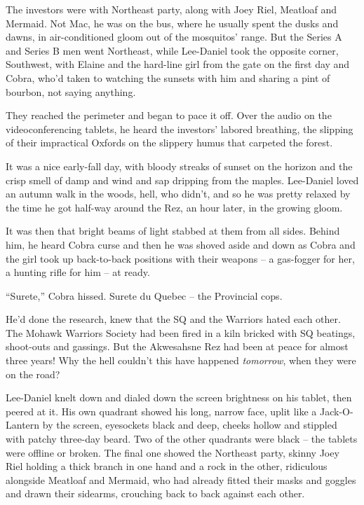 The investors were with Northeast party, along with Joey Riel, Meatloaf 
and Mermaid. Not Mac, he was on the bus, where he usually spent the 
dusks and dawns, in air-conditioned gloom out of the mosquitos' range. 
But the Series A and Series B men went Northeast, while Lee-Daniel took 
the opposite corner, Southwest, with Elaine and the hard-line girl from 
the gate on the first day and Cobra, who'd taken to watching the 
sunsets with him and sharing a pint of bourbon, not saying anything.

They reached the perimeter and began to pace it off. Over the audio on 
the videoconferencing tablets, he heard the investors' labored 
breathing, the slipping of their impractical Oxfords on the slippery 
humus that carpeted the forest.

It was a nice early-fall day, with bloody streaks of sunset on the 
horizon and the crisp smell of damp and wind and sap dripping from the 
maples. Lee-Daniel loved an autumn walk in the woods, hell, who didn't, 
and so he was pretty relaxed by the time he got half-way around the 
Rez, an hour later, in the growing gloom.

It was then that bright beams of light stabbed at them from all sides. 
Behind him, he heard Cobra curse and then he was shoved aside and down 
as Cobra and the girl took up back-to-back positions with their weapons 
-- a gas-fogger for her, a hunting rifle for him -- at ready.

“Surete,” Cobra hissed. Surete du Quebec -- the Provincial cops.

He'd done the research, knew that the SQ and the Warriors hated each 
other. The Mohawk Warriors Society had been fired in a kiln bricked 
with SQ beatings, shoot-outs and gassings. But the Akwesahsne Rez had 
been at peace for almost three years! Why the hell couldn't this have 
happened \emph{tomorrow}, when they were on the road?

Lee-Daniel knelt down and dialed down the screen brightness on his 
tablet, then peered at it. His own quadrant showed his long, narrow 
face, uplit like a Jack-O-Lantern by the screen, eyesockets black and 
deep, cheeks hollow and stippled with patchy three-day beard. Two of 
the other quadrants were black -- the tablets were offline or broken. 
The final one showed the Northeast party, skinny Joey Riel holding a 
thick branch in one hand and a rock in the other, ridiculous alongside 
Meatloaf and Mermaid, who had already fitted their masks and goggles 
and drawn their sidearms, crouching back to back against each other.

